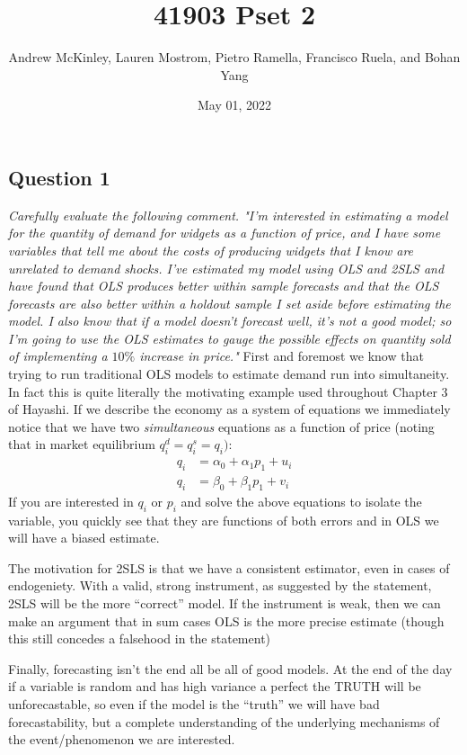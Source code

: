 \documentclass[
]{article}
\title{41903 Pset 2}
\author{Andrew McKinley, Lauren Mostrom, Pietro Ramella, Francisco
Ruela, and Bohan Yang}
\date{May 01, 2022}
\begin{document}
\maketitle

\hypertarget{question-1}{%
\subsection{Question 1}\label{question-1}}

\textit{Carefully evaluate the following comment. "I'm interested in estimating a model for the quantity of demand for widgets as a function of price, and I have some variables that tell me about the costs of producing widgets that I know are unrelated to demand shocks. I've estimated my model using OLS and 2SLS and have found that OLS produces better within sample forecasts and that the OLS forecasts are also better within a holdout sample I set aside before estimating the model. I also know that if a model doesn't forecast well, it's not a good model; so I'm going to use the OLS estimates to gauge the possible effects on quantity sold of implementing a $10 \%$ increase in price."}
\vspace{2mm} First and foremost we know that trying to run traditional
OLS models to estimate demand run into simultaneity. In fact this is
quite literally the motivating example used throughout Chapter 3 of
Hayashi. If we describe the economy as a system of equations we
immediately notice that we have two \textit{simultaneous} equations as a
function of price (noting that in market equilibrium
\(q_i^d = q_i^s = q_i)\): \begin{align*}
\tag{demand} q_i &=\alpha_0 + \alpha_1p_1 + u_i \\
\tag{supply} q_i &=\beta_0 + \beta_1p_1 + v_i
\end{align*} If you are interested in \(q_i\) or \(p_i\) and solve the
above equations to isolate the variable, you quickly see that they are
functions of both errors and in OLS we will have a biased estimate.

The motivation for 2SLS is that we have a consistent estimator, even in
cases of endogeniety. With a valid, strong instrument, as suggested by
the statement, 2SLS will be the more ``correct'' model. If the
instrument is weak, then we can make an argument that in sum cases OLS
is the more precise estimate (though this still concedes a falsehood in
the statement)

Finally, forecasting isn't the end all be all of good models. At the end
of the day if a variable is random and has high variance a perfect the
TRUTH will be unforecastable, so even if the model is the ``truth'' we
will have bad forecastability, but a complete understanding of the
underlying mechanisms of the event/phenomenon we are interested.
\end{document}

